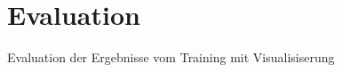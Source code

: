 
\chapter{Evaluation} %

\label{Evaluation} %

\begin{text}
Evaluation der Ergebnisse vom Training mit Visualisiserung
\end{text}